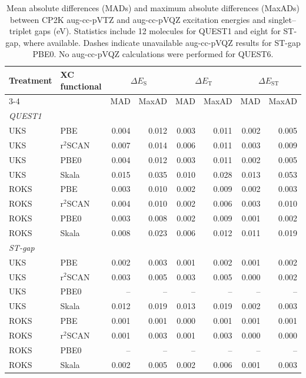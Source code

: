 \begin{table}[htbp]
\centering
\caption{Mean absolute differences (MADs) and maximum absolute differences (MaxADs) between CP2K aug-cc-pVTZ and aug-cc-pVQZ excitation energies and singlet--triplet gaps (eV). Statistics include 12 molecules for QUEST1 and eight for ST-gap, where available. Dashes indicate unavailable aug-cc-pVQZ results for ST-gap PBE0. No aug-cc-pVQZ calculations were performed for QUEST6.}
\label{tab:si_basis}
\footnotesize
\setlength{\tabcolsep}{4pt}
\begin{tabular}{@{}llrrrrrr@{}}
\hline
Treatment & XC functional & \multicolumn{2}{c}{$\Delta E_{\mathrm{S}}$} & \multicolumn{2}{c}{$\Delta E_{\mathrm{T}}$} & \multicolumn{2}{c}{$\Delta E_{\mathrm{ST}}$} \\
\cline{3-4}\cline{5-6}\cline{7-8}
 & & MAD & MaxAD & MAD & MaxAD & MAD & MaxAD \\
\hline
\multicolumn{8}{l}{\textit{QUEST1}} \\
UKS & PBE & 0.004 & 0.012 & 0.003 & 0.011 & 0.002 & 0.005 \\
UKS & r$^2$SCAN & 0.007 & 0.014 & 0.006 & 0.011 & 0.003 & 0.009 \\
UKS & PBE0 & 0.004 & 0.012 & 0.003 & 0.011 & 0.002 & 0.005 \\
UKS & Skala & 0.015 & 0.035 & 0.010 & 0.028 & 0.013 & 0.053 \\
\noalign{\smallskip}
ROKS & PBE & 0.003 & 0.010 & 0.002 & 0.009 & 0.002 & 0.003 \\
ROKS & r$^2$SCAN & 0.004 & 0.010 & 0.002 & 0.006 & 0.003 & 0.010 \\
ROKS & PBE0 & 0.003 & 0.008 & 0.002 & 0.009 & 0.001 & 0.002 \\
ROKS & Skala & 0.008 & 0.023 & 0.006 & 0.012 & 0.011 & 0.019 \\
\hline
\multicolumn{8}{l}{\textit{ST-gap}} \\
UKS & PBE & 0.002 & 0.003 & 0.001 & 0.002 & 0.001 & 0.002 \\
UKS & r$^2$SCAN & 0.003 & 0.005 & 0.003 & 0.005 & 0.000 & 0.002 \\
UKS & PBE0 & -- & -- & -- & -- & -- & -- \\
UKS & Skala & 0.012 & 0.019 & 0.013 & 0.019 & 0.002 & 0.003 \\
\noalign{\smallskip}
ROKS & PBE & 0.001 & 0.001 & 0.000 & 0.001 & 0.001 & 0.001 \\
ROKS & r$^2$SCAN & 0.001 & 0.003 & 0.001 & 0.003 & 0.000 & 0.000 \\
ROKS & PBE0 & -- & -- & -- & -- & -- & -- \\
ROKS & Skala & 0.002 & 0.005 & 0.002 & 0.006 & 0.001 & 0.003 \\
\hline\hline
\end{tabular}
\end{table}
